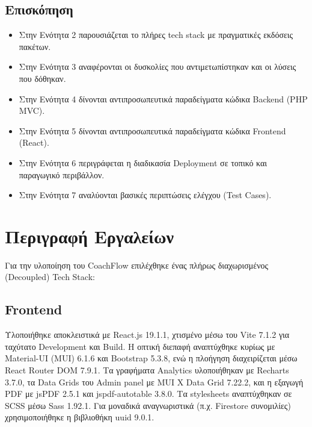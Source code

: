 \documentclass[12pt,a4paper]{report}
\begin{document}
\subsection{Επισκόπηση}
\begin{itemize}
    \item Στην Ενότητα 2 παρουσιάζεται το πλήρες \textenglish{tech stack} με πραγματικές εκδόσεις πακέτων.
    \item Στην Ενότητα 3 αναφέρονται οι δυσκολίες που αντιμετωπίστηκαν και οι λύσεις που δόθηκαν.
    \item Στην Ενότητα 4 δίνονται αντιπροσωπευτικά παραδείγματα κώδικα \textenglish{Backend (PHP MVC)}.
    \item Στην Ενότητα 5 δίνονται αντιπροσωπευτικά παραδείγματα κώδικα \textenglish{Frontend (React)}.
    \item Στην Ενότητα 6 περιγράφεται η διαδικασία \textenglish{Deployment} σε τοπικό και παραγωγικό περιβάλλον.
    \item Στην Ενότητα 7 αναλύονται βασικές περιπτώσεις ελέγχου (\textenglish{Test Cases}).
\end{itemize}

\newpage

\section{Περιγραφή Εργαλείων}
Για την υλοποίηση του \textenglish{CoachFlow} επιλέχθηκε ένας πλήρως διαχωρισμένος (\textenglish{Decoupled}) \textenglish{Tech Stack}:

\subsection{Frontend}
Υλοποιήθηκε αποκλειστικά με \textenglish{React.js 19.1.1}, χτισμένο μέσω του \textenglish{Vite 7.1.2} για ταχύτατο \textenglish{Development} και \textenglish{Build}. Η οπτική διεπαφή αναπτύχθηκε κυρίως με \textenglish{Material-UI (MUI) 6.1.6} και \textenglish{Bootstrap 5.3.8}, ενώ η πλοήγηση διαχειρίζεται μέσω \textenglish{React Router DOM 7.9.1}. Τα γραφήματα \textenglish{Analytics} υλοποιήθηκαν με \textenglish{Recharts 3.7.0}, τα \textenglish{Data Grids} του \textenglish{Admin} panel με \textenglish{MUI X Data Grid 7.22.2}, και η εξαγωγή \textenglish{PDF} με \textenglish{jsPDF 2.5.1} και \textenglish{jspdf-autotable 3.8.0}. Τα \textenglish{stylesheets} αναπτύχθηκαν σε \textenglish{SCSS} μέσω \textenglish{Sass 1.92.1}. Για μοναδικά αναγνωριστικά (π.χ. \textenglish{Firestore} συνομιλίες) χρησιμοποιήθηκε η βιβλιοθήκη \textenglish{uuid 9.0.1}.
\end{document}
